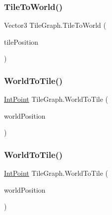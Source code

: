 \mbox{\label{class_tile_graph_ae13070f1638b7409ad1d63b5551bc3fa}} 
\subsubsection{\texorpdfstring{Tile\+To\+World()}{TileToWorld()}}
{\footnotesize\ttfamily Vector3 Tile\+Graph.\+Tile\+To\+World (\begin{DoxyParamCaption}\item[{\mbox{\hyperlink{struct_int_point}{Int\+Point}}}]{tile\+Position }\end{DoxyParamCaption})}

\mbox{\label{class_tile_graph_a470894695f1deb2d9c127a1e50d0b859}} 
\subsubsection{\texorpdfstring{World\+To\+Tile()}{WorldToTile()}\hspace{0.1cm}{\footnotesize\ttfamily [1/2]}}
{\footnotesize\ttfamily \mbox{\hyperlink{struct_int_point}{Int\+Point}} Tile\+Graph.\+World\+To\+Tile (\begin{DoxyParamCaption}\item[{Vector2}]{world\+Position }\end{DoxyParamCaption})}

\mbox{\label{class_tile_graph_a121a3327fefcf7009e2dc3c5d1c9d310}} 
\subsubsection{\texorpdfstring{World\+To\+Tile()}{WorldToTile()}\hspace{0.1cm}{\footnotesize\ttfamily [2/2]}}
{\footnotesize\ttfamily \mbox{\hyperlink{struct_int_point}{Int\+Point}} Tile\+Graph.\+World\+To\+Tile (\begin{DoxyParamCaption}\item[{Vector3}]{world\+Position }\end{DoxyParamCaption})}

